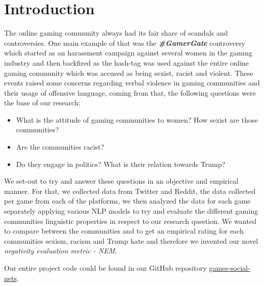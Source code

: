 \section{Introduction}
The online gaming community always had its fair share of scandals and controversies.
One main example of that was the \textbf{\emph{\#GamerGate}} controversy which started as an harassment campaign against several women in the gaming industry and then backfired as the hash-tag was used against the entire online gaming community which was accused as being sexist, racist and violent. These events raised some concerns regarding verbal violence in gaming communities and their usage of offensive language, coming from that, the following questions were the base of our research:

\begin{itemize}
    \item What is the attitude of gaming communities to women? How sexist are those communities?
    \item Are the communities racist?
    \item Do they engage in politics? What is their relation towards Trump?
\end{itemize}  

We set-out to try and answer these questions in an objective and empirical manner. For that, we collected data from Twitter and Reddit, the data collected per game from each of the platforms, we then analyzed the data for each game separately applying various NLP models to try and evaluate the different gaming communities linguistic properties in respect to our research question.
We wanted to compare between the communities and to get an empirical rating for each communities sexism, racism and Trump hate and therefore we invented our novel \emph{ negativity evaluation metric - NEM}.

Our entire project code could be found in our GitHub repository \href{https://github.com/goldmyu/games-social-nets}{games-social-nets}.
